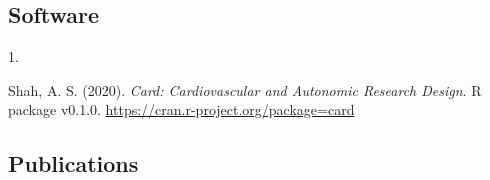 \documentclass[10pt,a4paper,]{article}
\newlength{\cslhangindent}
\newlength{\csllabelwidth}
\newenvironment{CSLReferences}[2] %
 {\begin{list}{}{%
  \setlength{\itemindent}{0pt}
  \setlength{\leftmargin}{0pt}
  \setlength{\parsep}{0pt}
  \ifodd #1
   \setlength{\leftmargin}{\cslhangindent}
   \setlength{\itemindent}{-1\cslhangindent}
  \fi
  \setlength{\itemsep}{#2\baselineskip}}}
 {\end{list}}
\newcommand{\CSLLeftMargin}[1]{\parbox[t]{\csllabelwidth}{\strut#1\strut}}
\newcommand{\CSLRightInline}[1]{\parbox[t]{\linewidth - \csllabelwidth}{\strut#1\strut}}
\begin{document}
\hypertarget{software}{%
\subsection{Software}\label{software}}

\hypertarget{refs-856f3d8b7b35087366dec7c3bcea3346}{}
\begin{CSLReferences}{0}{0}
\leavevmode{}%
\CSLLeftMargin{1. }%
\CSLRightInline{Shah, A. S. (2020). \emph{Card: Cardiovascular and
Autonomic Research Design}. R package v0.1.0.
\url{https://cran.r-project.org/package=card}}

\end{CSLReferences}

\hypertarget{publications}{%
\subsection{Publications}\label{publications}}
\end{document}
